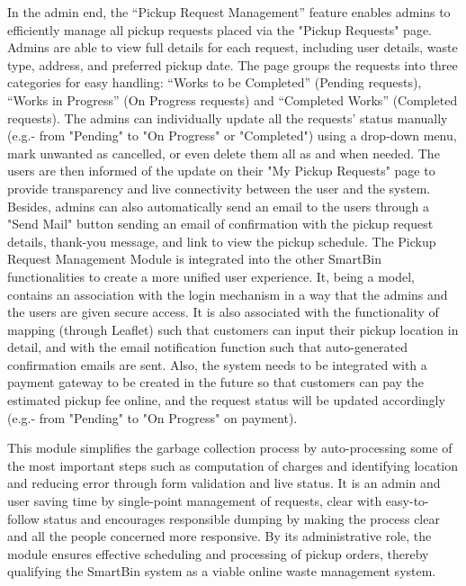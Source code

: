 \documentclass{article}
\begin{document}
In the admin end, the “Pickup Request Management” feature enables admins to efficiently 
manage all pickup requests placed via the "Pickup Requests" page. Admins are able to 
view full details for each request, including user details, waste type, address, and preferred 
pickup date. The page groups the requests into three categories for easy handling: “Works 
to be Completed” (Pending requests), “Works in Progress” (On Progress requests) and 
“Completed Works” (Completed requests). The admins can individually update all the 
requests' status manually (e.g.- from "Pending" to "On Progress" or "Completed") using a 
drop-down menu, mark unwanted as cancelled, or even delete them all as and when 
needed. The users are then informed of the update on their "My Pickup Requests" page to 
provide transparency and live connectivity between the user and the system. Besides, 
admins can also automatically send an email to the users through a "Send Mail" button 
sending an email of confirmation with the pickup request details, thank-you message, and 
link to view the pickup schedule. 
The Pickup Request Management Module is integrated into the other SmartBin 
functionalities to create a more unified user experience. It, being a model, contains an 
association with the login mechanism in a way that the admins and the users are given 
secure access. It is also associated with the functionality of mapping (through Leaflet) 
such that customers can input their pickup location in detail, and with the email 
notification function such that auto-generated confirmation emails are sent. Also, the 
system needs to be integrated with a payment gateway to be created in the future so that 
customers can pay the estimated pickup fee online, and the request status will be updated 
accordingly (e.g.- from "Pending" to "On Progress" on payment). 
 
This module simplifies the garbage collection process by auto-processing some of the 
most important steps such as computation of charges and identifying location and 
reducing error through form validation and live status. 
It is an admin and user saving time by single-point management of requests, clear with 
easy-to-follow status and encourages responsible dumping by making the process clear 
and all the people concerned more responsive. By its administrative role, the module 
ensures effective scheduling and processing of pickup orders, thereby qualifying the 
SmartBin system as a viable online waste management system. 
 
 
 
\end{document}
